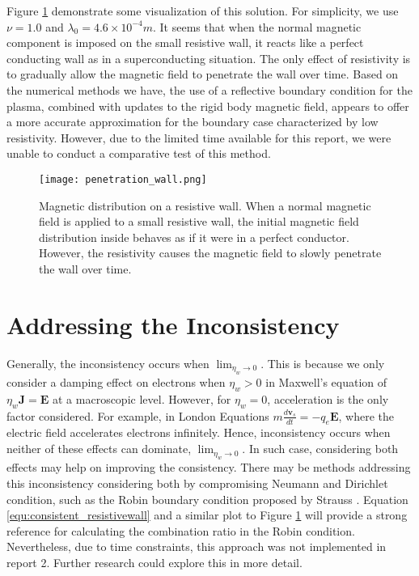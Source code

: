 Figure \ref{fig:smallResistivityWall} demonstrate some visualization of this solution. For simplicity, we use $\nu=1.0$ and $\lambda_{0}=4.6\times10^{-4}m$. It seems that when the normal magnetic component is imposed on the small resistive wall, it reacts like a perfect conducting wall as in a superconducting situation. The only effect of resistivity is to gradually allow the magnetic field to penetrate the wall over time. Based on the numerical methods we have, the use of a reflective boundary condition for the plasma, combined with updates to the rigid body magnetic field, appears to offer a more accurate approximation for the boundary case characterized by low resistivity. However, due to the limited time available for this report, we were unable to conduct a comparative test of this method.  

\begin{figure}[H]
	\centering
	\texttt{[image: penetration\_wall.png]}
	\caption[Bx Distribution on resistive wall]{Magnetic distribution on a resistive wall. When a normal magnetic field is applied to a small resistive wall, the initial magnetic field distribution inside behaves as if it were in a perfect conductor. However, the resistivity causes the magnetic field to slowly penetrate the wall over time.}
	\label{fig:smallResistivityWall}
\end{figure}
\section{Addressing the Inconsistency}
Generally, the inconsistency occurs when $\lim_{\eta_w \to 0}$. This is because we only consider a damping effect on electrons when $\eta_w>0$ in Maxwell's equation of $\eta_w\mathbf{J}=\mathbf{E}$ at a macroscopic level. However, for $\eta_w=0$, acceleration is the only factor considered. For example, in London Equations $m\frac{d\mathbf{v}_s}{dt}=-q_e\mathbf{E}$, where the electric field accelerates electrons infinitely. Hence, inconsistency occurs when neither of these effects can dominate, $\lim_{\eta_w \to 0}$. In such case, considering both effects may help on improving the consistency. There may be methods addressing this inconsistency considering both by compromising Neumann and Dirichlet condition, such as the Robin boundary condition proposed by Strauss \cite{strauss2014velocity}. Equation \ref{equ:consistent_resistivewall} and a similar plot to Figure \ref{fig:smallResistivityWall} will provide a strong reference for calculating the combination ratio in the Robin condition. Nevertheless, due to time constraints, this approach was not implemented in report 2. Further research could explore this in more detail.